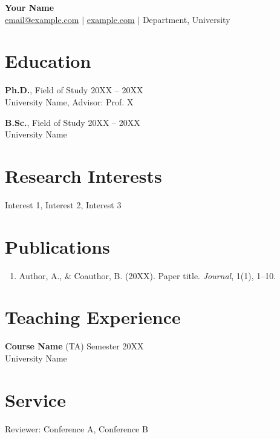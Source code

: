 \documentclass[11pt,a4paper]{article}
\begin{document}
\begin{center}
  {\LARGE \textbf{Your Name}}\\[4pt]
  \href{mailto:email@example.com}{email@example.com} $|$
  \href{https://example.com}{example.com} $|$
  Department, University
\end{center}

\section*{Education}
\noindent\textbf{Ph.D.}, Field of Study \hfill 20XX -- 20XX\\
University Name, Advisor: Prof. X

\noindent\textbf{B.Sc.}, Field of Study \hfill 20XX -- 20XX\\
University Name

\section*{Research Interests}
Interest 1, Interest 2, Interest 3

\section*{Publications}
\begin{enumerate}
  \item Author, A., \& Coauthor, B. (20XX).
  Paper title. \textit{Journal}, 1(1), 1--10.
\end{enumerate}

\section*{Teaching Experience}
\noindent\textbf{Course Name} (TA) \hfill Semester 20XX\\
University Name

\section*{Service}
Reviewer: Conference A, Conference B
\end{document}
